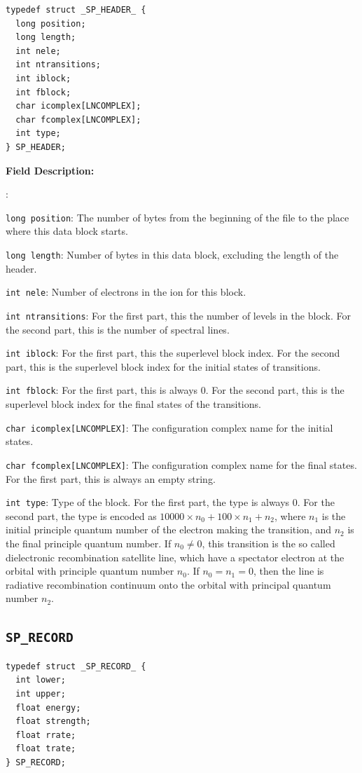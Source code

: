 \documentclass[twoside,letterpaper]{refrep}
\newenvironment{dbdesc}{\textbf{Field Description:} \begin{list}
	{:}{\setlength{\labelwidth}{2in}
	   \setlength{\leftmargin}{2in}
	   \setlength{\labelsep}{0.1in}
	   \setlength{\rightmargin}{0.2in}}}
	{\end{list}}
\begin{document}
\begin{verbatim}
typedef struct _SP_HEADER_ { 
  long position;
  long length;
  int nele;
  int ntransitions;
  int iblock;
  int fblock;
  char icomplex[LNCOMPLEX];
  char fcomplex[LNCOMPLEX];
  int type;
} SP_HEADER;
\end{verbatim}

\begin{dbdesc}
\item[\texttt{long position}:] The number of bytes from the beginning of the
file to the place where this data block starts.
\item[\texttt{long length}:] Number of bytes in this data block, excluding the
length of the header.
\item[\texttt{int nele}:] Number of electrons in the ion for this block.
\item[\texttt{int ntransitions}:] For the first part, this the number of
levels in the block. For the second part, this is the number of spectral lines.
\item[\texttt{int iblock}:] For the first part, this the superlevel block
index. For the second part, this is the superlevel block index for the initial
states of transitions.
\item[\texttt{int fblock}:] For the first part, this is always 0. For the
second part, this is the superlevel block index for the final states of the
transitions.
\item[\texttt{char icomplex[LNCOMPLEX]}:] The configuration complex name for
the initial states. 
\item[\texttt{char fcomplex[LNCOMPLEX]}:] The configuration complex name for
the final states. For the first part, this is always an empty string.
\item[\texttt{int type}:] Type of the block. For the first part, the type is
always 0. For the second part, the type is encoded as $10000\times n_0 +
100\times n_1 + n_2$, where $n_1$ is the initial principle quantum number of
the electron making the transition, and $n_2$ is the final principle quantum
number. If $n_0 \ne 0$, this transition is the so called dielectronic
recombination satellite line, which have a spectator electron at the orbital
with principle quantum number $n_0$. If $n_0=n_1=0$, then the line is
radiative recombination continuum onto the orbital with principal quantum
number $n_2$. 
\end{dbdesc}

\subsection{\texttt{SP\_RECORD}}
\begin{verbatim}
typedef struct _SP_RECORD_ {
  int lower;
  int upper;
  float energy;
  float strength;
  float rrate;
  float trate;
} SP_RECORD;
\end{verbatim}
\end{document}

